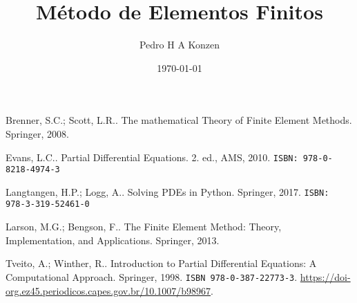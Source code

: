 \documentclass[12pt]{book}
\begin{document}
\frontmatter

\title{Método de Elementos Finitos}
\author{Pedro H A Konzen}
\date{\today}
\ifishtml
\else
{}
\fi

\maketitle




\tableofcontents
{}

\mainmatter




\ifisbook

\fi

\ifisbook
\clearpage
{}
{}
\fi

\begin{thebibliography}{99}
  Brenner, S.C.; Scott, L.R.. The mathematical Theory of Finite Element Methods. Springer, 2008.

  Evans, L.C.. Partial Differential Equations. 2. ed., AMS, 2010. \texttt{ISBN: 978-0-8218-4974-3}
  
  Langtangen, H.P.; Logg, A.. Solving PDEs in Python. Springer, 2017. \texttt{ISBN: 978-3-319-52461-0}

  Larson, M.G.; Bengson, F.. The Finite Element Method: Theory, Implementation, and Applications. Springer, 2013.

  Tveito, A.; Winther, R.. Introduction to Partial Differential Equations: A Computational Approach. Springer, 1998. \texttt{ISBN 978-0-387-22773-3}. \url{https://doi-org.ez45.periodicos.capes.gov.br/10.1007/b98967}.
\end{thebibliography}
\end{document}
